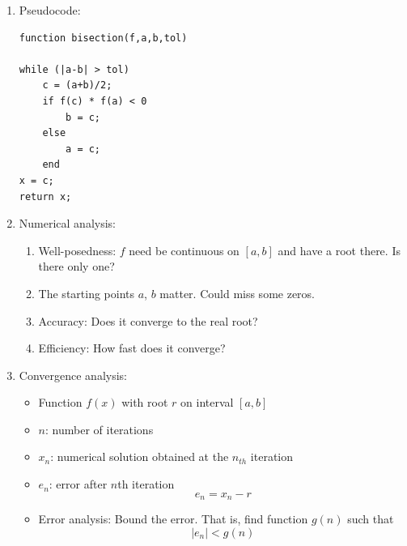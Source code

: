 \documentclass{article}
\theoremstyle{remark}
\begin{document}
\begin{enumerate}
\item Pseudocode: 
\begin{verbatim}
function bisection(f,a,b,tol)

while (|a-b| > tol)
    c = (a+b)/2;
    if f(c) * f(a) < 0
        b = c;
    else
        a = c;
    end
x = c;
return x;
\end{verbatim}

\item Numerical analysis:
\begin{enumerate}
\item Well-posedness: $f$ need be continuous on $[a,b]$ and have a root there. Is there only one?
\item The starting points $a$, $b$ matter. Could miss some zeros. \\
\item Accuracy: Does it converge to the real root?
\item Efficiency: How fast does it converge?
\end{enumerate}

\item Convergence analysis:
\begin{itemize}
\item Function $f(x)$ with root $r$ on interval $[a,b]$
\item $n$: number of iterations
\item $x_n$: numerical solution obtained at the $n_{th}$ iteration
\item $e_n$: error after $n$th iteration 
\[
e_n = x_n - r
\]
\item Error analysis: Bound the error. That is, find function $g(n)$ such that  
\[
|e_n| < g(n)
\]
\end{itemize}


\end{enumerate}
\end{document}
